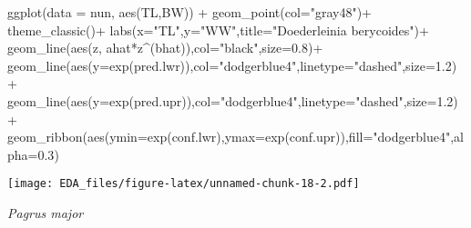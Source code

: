 \documentclass[
]{article}
\newenvironment{Shaded}{\begin{snugshade}}{\end{snugshade}}
\newcommand{\AttributeTok}[1]{\textcolor[rgb]{0.77,0.63,0.00}{#1}}
\newcommand{\FloatTok}[1]{\textcolor[rgb]{0.00,0.00,0.81}{#1}}
\newcommand{\FunctionTok}[1]{\textcolor[rgb]{0.00,0.00,0.00}{#1}}
\newcommand{\NormalTok}[1]{#1}
\newcommand{\SpecialCharTok}[1]{\textcolor[rgb]{0.00,0.00,0.00}{#1}}
\newcommand{\StringTok}[1]{\textcolor[rgb]{0.31,0.60,0.02}{#1}}
\begin{document}
\begin{Shaded}
\begin{Highlighting}[]
\FunctionTok{ggplot}\NormalTok{(}\AttributeTok{data =}\NormalTok{ nun, }\FunctionTok{aes}\NormalTok{(TL,BW)) }\SpecialCharTok{+} \FunctionTok{geom\_point}\NormalTok{(}\AttributeTok{col=}\StringTok{"gray48"}\NormalTok{)}\SpecialCharTok{+} 
  \FunctionTok{theme\_classic}\NormalTok{()}\SpecialCharTok{+} \FunctionTok{labs}\NormalTok{(}\AttributeTok{x=}\StringTok{"TL"}\NormalTok{,}\AttributeTok{y=}\StringTok{"WW"}\NormalTok{,}\AttributeTok{title=}\StringTok{"Doederleinia berycoides"}\NormalTok{)}\SpecialCharTok{+}
  \FunctionTok{geom\_line}\NormalTok{(}\FunctionTok{aes}\NormalTok{(z, ahat}\SpecialCharTok{*}\NormalTok{z}\SpecialCharTok{\^{}}\NormalTok{(bhat)),}\AttributeTok{col=}\StringTok{"black"}\NormalTok{,}\AttributeTok{size=}\FloatTok{0.8}\NormalTok{)}\SpecialCharTok{+}
  \FunctionTok{geom\_line}\NormalTok{(}\FunctionTok{aes}\NormalTok{(}\AttributeTok{y=}\FunctionTok{exp}\NormalTok{(pred.lwr)),}\AttributeTok{col=}\StringTok{"dodgerblue4"}\NormalTok{,}\AttributeTok{linetype=}\StringTok{"dashed"}\NormalTok{,}\AttributeTok{size=}\FloatTok{1.2}\NormalTok{)}\SpecialCharTok{+} 
  \FunctionTok{geom\_line}\NormalTok{(}\FunctionTok{aes}\NormalTok{(}\AttributeTok{y=}\FunctionTok{exp}\NormalTok{(pred.upr)),}\AttributeTok{col=}\StringTok{"dodgerblue4"}\NormalTok{,}\AttributeTok{linetype=}\StringTok{"dashed"}\NormalTok{,}\AttributeTok{size=}\FloatTok{1.2}\NormalTok{)}\SpecialCharTok{+}
  \FunctionTok{geom\_ribbon}\NormalTok{(}\FunctionTok{aes}\NormalTok{(}\AttributeTok{ymin=}\FunctionTok{exp}\NormalTok{(conf.lwr),}\AttributeTok{ymax=}\FunctionTok{exp}\NormalTok{(conf.upr)),}\AttributeTok{fill=}\StringTok{"dodgerblue4"}\NormalTok{,}\AttributeTok{alpha=}\FloatTok{0.3}\NormalTok{)}
\end{Highlighting}
\end{Shaded}

\texttt{[image: EDA\_files/figure-latex/unnamed-chunk-18-2.pdf]}

\emph{Pagrus major}
\end{document}
